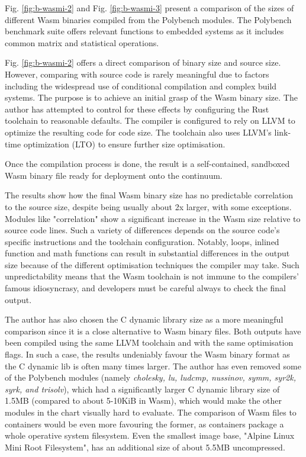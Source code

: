 Fig. \ref{fig:b-wasmi-2} and Fig. \ref{fig:b-wasmi-3} present a comparison of the sizes of different Wasm binaries compiled from the Polybench \cite{polybench} modules. The Polybench benchmark suite offers relevant functions to embedded systems as it includes common matrix and statistical operations.

Fig. \ref{fig:b-wasmi-2} offers a direct comparison of binary size and source size. However, comparing with source code is rarely meaningful due to factors including the widespread use of conditional compilation and complex build systems. The purpose is to achieve an initial grasp of the Wasm binary size. The author has attempted to control for these effects by configuring the Rust toolchain to reasonable defaults. The compiler is configured to rely on LLVM to optimize the resulting code for code size. The toolchain also uses LLVM's link-time optimization (LTO) to ensure further size optimisation.

Once the compilation process is done, the result is a self-contained, sandboxed Wasm binary file ready for deployment onto the continuum.

The results show how the final Wasm binary size has no predictable correlation to the source size, despite being usually about 2x larger, with some exceptions. Modules like "correlation" show a significant increase in the Wasm size relative to source code lines. Such a variety of differences depends on the source code's specific instructions and the toolchain configuration. Notably, loops, inlined function and math functions can result in substantial differences in the output size because of the different optimisation techniques the compiler may take. Such unpredictability means that the Wasm toolchain is not immune to the compilers' famous idiosyncrasy, and developers must be careful always to check the final output.

The author has also chosen the C dynamic library size as a more meaningful comparison since it is a close alternative to Wasm binary files. Both outputs have been compiled using the same LLVM toolchain and with the same optimisation flags. In such a case, the results undeniably favour the Wasm binary format as the C dynamic lib is often many times larger. The author has even removed some of the Polybench modules (namely \emph{cholesky, lu, ludcmp, nussinov, symm, syr2k, syrk, and trisolv}), which had a significantly larger C dynamic library size of 1.5MB (compared to about 5-10KiB in Wasm), which would make the other modules in the chart visually hard to evaluate. The comparison of Wasm files to containers would be even more favouring the former, as containers package a whole operative system filesystem. Even the smallest image base, "Alpine Linux Mini Root Filesystem", has an additional size of about 5.5MB uncompressed.

